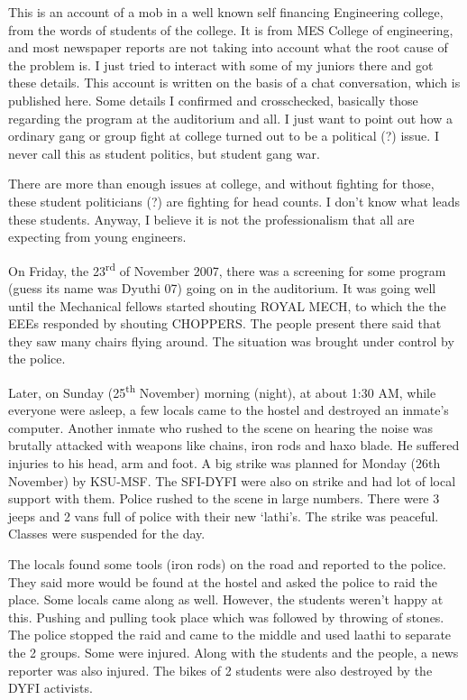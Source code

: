 \vskip 2pt
{\engtext
This is an account of a mob in a well known self financing Engineering college, from the words of students of the college. It is from MES College of engineering, and most newspaper reports are not taking into account what the root cause of the problem is. I just tried to interact with some of my juniors there and got these details. This account is written on the basis of a chat conversation, which is published here. Some details I confirmed and crosschecked, basically those regarding the program at the auditorium and all. I just want to point out how a ordinary gang or group fight at college turned out to be a political (?) issue. I never call this as student politics, but student gang war.

There are more than enough issues at college, and without fighting for those, these student politicians (?) are fighting for head counts. I don’t know what leads these students. Anyway, I believe it is not the professionalism that all are expecting from young engineers.

On Friday, the 23\textsuperscript{rd} of November 2007, there was a screening for some program (guess its name was Dyuthi 07) going on in the auditorium. It was going well until the Mechanical fellows started shouting ROYAL MECH, to which the the EEEs responded by shouting CHOPPERS. The people present there said that they saw many chairs flying around. The situation was brought under control by the police.

Later, on Sunday (25\textsuperscript{th} November) morning (night), at about 1:30 AM, while everyone were asleep, a few locals came to the hostel and destroyed an inmate’s computer. Another inmate who rushed to the scene on hearing the noise was brutally attacked with weapons like chains, iron rods and haxo blade. He suffered injuries to his head, arm and foot.
A big strike was planned for Monday (26th November) by KSU-MSF. The SFI-DYFI were also on strike and had lot of local support with them. Police rushed to the scene in large numbers. There were 3 jeeps and 2 vans full of police with their new ‘lathi’s. The strike was peaceful. Classes were suspended for the day.

The locals found some tools (iron rods) on the road and reported to the police. They said more would be found at the hostel and asked the police to raid the place. Some locals came along as well. However, the students weren't happy at this. Pushing and pulling took place which was followed by throwing of stones. The police stopped the raid and came to the middle and used laathi to separate the 2 groups. Some were injured.
Along with the students and the people, a news reporter was also injured. The bikes of 2 students were also destroyed by the DYFI activists.

}
